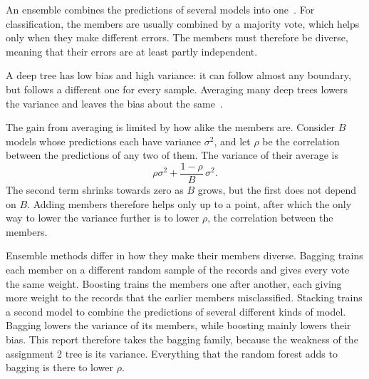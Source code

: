 \documentclass[conference,10pt]{IEEEtran}
\begin{document}
An ensemble combines the predictions of several models into
one~\cite{dietterich2000ensemble}. For classification, the members are usually combined by a majority vote,
which helps only when they make different errors.  The members must therefore be diverse, meaning that their errors
are at least partly independent.

A deep tree has low bias and high variance: it can follow almost any
boundary, but follows a different one for every sample. Averaging many deep
trees lowers the variance and leaves the bias about the
same~\cite{hastie2009elements}.

The gain from averaging is limited by how alike the members are. Consider
$B$ models whose predictions each have variance $\sigma^2$, and let $\rho$
be the correlation between the predictions of any two of them. The variance
of their average is~\cite[Eq.~15.1]{hastie2009elements}
\begin{equation}
  \rho\sigma^2 + \frac{1-\rho}{B}\,\sigma^2 .
\end{equation}
The second term shrinks towards zero as $B$ grows, but the first does not
depend on $B$. Adding members therefore helps only up to a point, after
which the only way to lower the variance further is to lower $\rho$, the
correlation between the members.

Ensemble methods differ in how they make their members diverse. Bagging
trains each member on a different random sample of the records and gives
every vote the same weight. Boosting trains the members one after another, each giving more weight to
the records that the earlier members misclassified.
Stacking trains a second model to combine the predictions of several
different kinds of model. Bagging lowers the variance of its members, while
boosting mainly lowers their bias. This report therefore takes the bagging
family, because the weakness of the assignment 2 tree is its variance.
Everything that the random forest adds to bagging is there to lower $\rho$.
\end{document}
